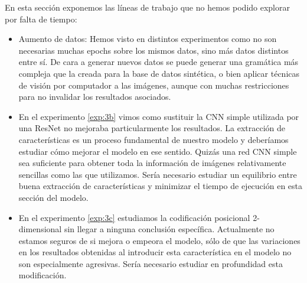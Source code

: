 \documentclass[a4paper, 20pt, dvipsnames]{article}
\begin{document}
En esta sección exponemos las líneas de trabajo que no hemos podido explorar
por falta de tiempo:

\begin{itemize}
\item
	Aumento de datos: Hemos visto en distintos experimentos como no son
	necesarias muchas epochs sobre los mismos datos, sino más datos distintos
	entre sí. De cara a generar nuevos datos se puede generar una gramática más
	compleja que la creada para la base de datos sintética, o bien aplicar
	técnicas de visión por computador a las imágenes, aunque con muchas
	restricciones para no invalidar los resultados asociados.
	
\item
	En el experimento \ref{exp:3b} vimos como sustituir la CNN simple utilizada
	por una ResNet no mejoraba particularmente los resultados. La extracción
	de características es un proceso fundamental de nuestro modelo y deberíamos
	estudiar cómo mejorar el modelo en ese sentido. Quizás una red CNN simple
	sea suficiente para obtener toda la información de imágenes relativamente
	sencillas como las que utilizamos. Sería necesario estudiar un equilibrio
	entre buena extracción de características y minimizar el tiempo de ejecución
	en esta sección del modelo.
	
\item
	En el experimento \ref{exp:3c} estudiamos la codificación posicional
	2-dimensional sin llegar a ninguna conclusión específica. Actualmente
	no estamos seguros de si mejora o empeora el modelo, sólo de que las
	variaciones en los resultados obtenidas al introducir esta característica
	en el modelo no son especialmente agresivas. Sería necesario estudiar en
	profundidad esta modificación.
\end{itemize}







\printbibliography
\end{document}
